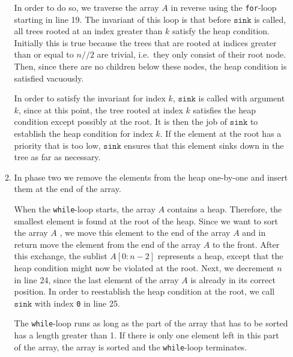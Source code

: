 \begin{enumerate}
\begin{enumerate}
            In order to do so, we traverse the array ${A}$ in reverse using the
            \texttt{for}-loop starting in line 19.  The invariant of this loop is that before
            $\texttt{sink}$ is called, all trees rooted at an index greater than 
            ${k}$ satisfy the heap condition.  Initially this is true because the trees that
            are rooted at indices greater than or equal to ${n}// 2$ are trivial, i.e.~they only
            consist of their root node.  Then, since there are no children below these nodes, the heap
            condition is satisfied vacuously. 
            
            In order to satisfy the invariant for index ${k}$, $\texttt{sink}$ is called with
            argument ${k}$,  since at this point, the tree rooted at index ${k}$ satisfies
            the heap condition except possibly at the root.  It is then the job of $\texttt{sink}$ to
            establish the heap condition for index ${k}$.  If the element at the root has a
            priority that is too low, $\texttt{sink}$ ensures that this element sinks down in the tree
            as far as necessary.
      \item In phase two we remove the elements from the heap one-by-one and insert them at the end of
            the array.

            When the \texttt{while}-loop starts, the array ${A}$ contains a heap.  Therefore,
            the smallest element is found at the root of the heap.  Since we want to sort the
            array ${A}$ , we move this element to the end of the array ${A}$ and in
            return move the element from the end of the array ${A}$ to the front.
            After this exchange, the sublist $A[0:n-2]$ represents a heap, except that the
            heap condition might now be violated at the root.  Next, we decrement ${n}$ in line 24, since the
            last element of the array ${A}$ is already in its correct position.  
            In order to reestablish the heap condition at the root, we call $\texttt{sink}$ with index
            \texttt{0} in line 25.

            The \texttt{while}-loop runs as long as the part of the array that has to be sorted has
            a length greater than 1.  If there is only one element left in this part of the array, the array is
            sorted and the \texttt{while}-loop terminates.
      \end{enumerate}
\end{enumerate}

